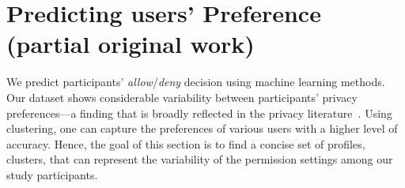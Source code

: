 %


\section{Predicting users' Preference (partial original work)}
We predict participants' \textit{allow}/\textit{deny} decision using machine learning methods. Our dataset shows considerable variability between participants' privacy preferences---a finding that is broadly reflected in the privacy literature~\cite{knijnenburg2013dimensionality}. Using clustering, one can capture the preferences of various users with a higher level of accuracy. Hence, the goal of this section is to find a concise set of profiles, clusters, that can represent the variability of the permission settings among our study participants. 

